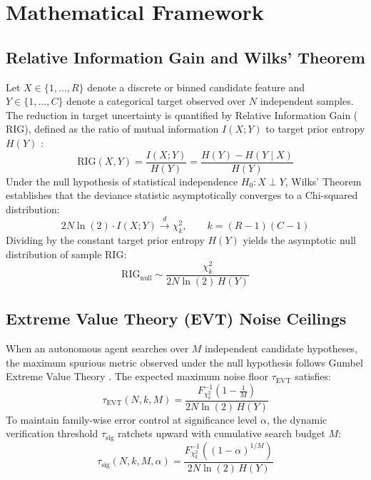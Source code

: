 \documentclass[11pt,a4paper]{article}
\begin{document}
\section{Mathematical Framework}

\subsection{Relative Information Gain and Wilks' Theorem}
Let $X \in \{1, \dots, R\}$ denote a discrete or binned candidate feature and $Y \in \{1, \dots, C\}$ denote a categorical target observed over $N$ independent samples. The reduction in target uncertainty is quantified by Relative Information Gain ($\text{RIG}$), defined as the ratio of mutual information $I(X; Y)$ to target prior entropy $H(Y)$ \cite{cover2006}:
\begin{equation}
\text{RIG}(X, Y) = \frac{I(X; Y)}{H(Y)} = \frac{H(Y) - H(Y \mid X)}{H(Y)}
\end{equation}
Under the null hypothesis of statistical independence $H_0: X \perp Y$, Wilks' Theorem \cite{wilks1938} establishes that the deviance statistic asymptotically converges to a Chi-squared distribution:
\begin{equation}
2 N \ln(2) \cdot I(X; Y) \xrightarrow{d} \chi^2_k, \qquad k = (R - 1)(C - 1)
\end{equation}
Dividing by the constant target prior entropy $H(Y)$ yields the asymptotic null distribution of sample $\text{RIG}$:
\begin{equation}
\text{RIG}_{\text{null}} \sim \frac{\chi^2_k}{2 N \ln(2) \, H(Y)}
\end{equation}

\subsection{Extreme Value Theory (EVT) Noise Ceilings}
When an autonomous agent searches over $M$ independent candidate hypotheses, the maximum spurious metric observed under the null hypothesis follows Gumbel Extreme Value Theory \cite{gumbel1958}. The expected maximum noise floor $\tau_{\text{EVT}}$ satisfies:
\begin{equation}
\tau_{\text{EVT}}(N, k, M) = \frac{F^{-1}_{\chi^2_k}\left(1 - \frac{1}{M}\right)}{2 N \ln(2) \, H(Y)}
\end{equation}
To maintain family-wise error control at significance level $\alpha$, the dynamic verification threshold $\tau_{\text{sig}}$ ratchets upward with cumulative search budget $M$:
\begin{equation}
\tau_{\text{sig}}(N, k, M, \alpha) = \frac{F^{-1}_{\chi^2_k}\left((1 - \alpha)^{1/M}\right)}{2 N \ln(2) \, H(Y)}
\end{equation}
\end{document}
